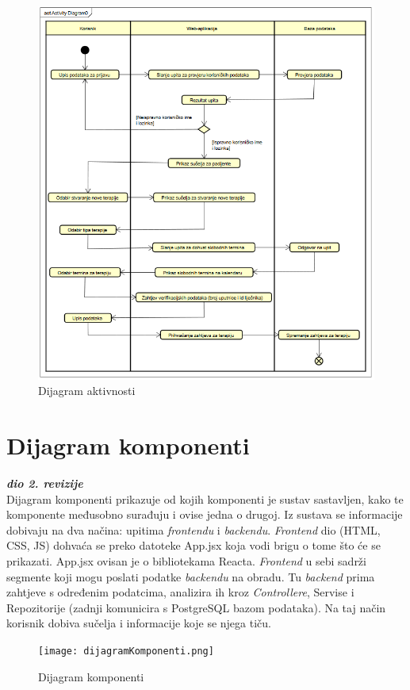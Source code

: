             \begin{figure}[H]
             \centering
             \includegraphics[width=1\linewidth]{slike/dijagramAktivnosti.png}
             \caption{Dijagram aktivnosti}
             \end{figure}
			\eject

		\section{Dijagram komponenti}
			
			\textbf{\textit{dio 2. revizije}}\\
			

            Dijagram komponenti prikazuje od kojih komponenti je sustav sastavljen, kako te komponente međusobno surađuju i ovise jedna o drugoj. Iz sustava se informacije dobivaju na dva načina: upitima \textit{frontendu} i \textit{backendu}. \textit{Frontend} dio (HTML, CSS, JS) dohvaća se preko datoteke App.jsx koja vodi brigu o tome što će se prikazati. App.jsx ovisan je o bibliotekama Reacta. \textit{Frontend} u sebi sadrži segmente koji mogu poslati podatke \textit{backendu} na obradu. Tu \textit{backend} prima zahtjeve s određenim podatcima, analizira ih kroz \textit{Controllere}, Servise i Repozitorije (zadnji komunicira s PostgreSQL bazom podataka). Na taj način korisnik dobiva sučelja i informacije koje se njega tiču.
            
            \begin{figure}[H]
             \centering
             \texttt{[image: dijagramKomponenti.png]}
             \caption{Dijagram komponenti}
             \end{figure}
			\eject 

